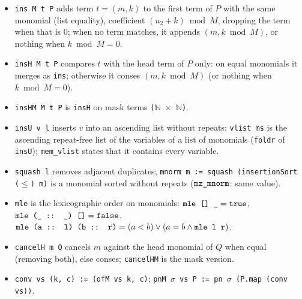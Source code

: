 \begin{definition}\label{def:lean-pathsum-ins}
\begin{itemize}
\item \textnormal{\texttt{ins M t P}} adds term $t=(m,k)$ to the first term of $P$ with the same monomial (list
  equality), coefficient $(u_2+k)\bmod M$, dropping the term when that is $0$; when no term
  matches, it appends $(m, k\bmod M)$, or nothing when $k\bmod M=0$.
\item \textnormal{\texttt{insH M t P}} compares $t$ with the head term of $P$ only: on equal monomials it merges
  as \textnormal{\texttt{ins}}; otherwise it conses $(m,k\bmod M)$ (or nothing when $k\bmod M = 0$).
\item \textnormal{\texttt{insHM M t P}} is \textnormal{\texttt{insH}} on mask terms \textnormal{\texttt{(\allowbreak{}\ensuremath{\mathbb{N}} \ensuremath{\times} \ensuremath{\mathbb{N}})}}.
\item \textnormal{\texttt{insU v l}} inserts $v$ into an ascending list without repeats; \textnormal{\texttt{vlist ms}} is the
  ascending repeat-free list of the variables of a list of monomials
  (\textnormal{\texttt{foldr}} of \textnormal{\texttt{insU}}); \textnormal{\texttt{mem\_\allowbreak{}vlist}} states that it contains every variable.
\item \textnormal{\texttt{squash l}} removes adjacent duplicates; \textnormal{\texttt{mnorm m := squash (\allowbreak{}insertionSort (\allowbreak{}\ensuremath{\le}) m)}}
  is a monomial sorted without repeats ($\textnormal{\texttt{mz\_\allowbreak{}mnorm}}$: same value).
\item \textnormal{\texttt{mle}} is the lexicographic order on monomials:
  $\textnormal{\texttt{mle [] \_\allowbreak{}}} = \textnormal{\texttt{true}}$, $\textnormal{\texttt{mle (\allowbreak{}\_\allowbreak{} :: \_\allowbreak{}) []}} = \textnormal{\texttt{false}}$,
  $\textnormal{\texttt{mle (\allowbreak{}a :: l) (\allowbreak{}b :: r)}} = (a<b)\vee(a=b\wedge \textnormal{\texttt{mle l r}})$.
\item \textnormal{\texttt{cancelH m Q}} cancels $m$ against the head monomial of $Q$ when equal (removing both),
  else conses; \textnormal{\texttt{cancelHM}} is the mask version.
\item \textnormal{\texttt{conv vs (\allowbreak{}k,\allowbreak{} c) := (\allowbreak{}ofM vs k,\allowbreak{} c)}}; \textnormal{\texttt{pnM \ensuremath{\sigma} vs P := pn \ensuremath{\sigma} (\allowbreak{}P.\allowbreak{}map (\allowbreak{}conv vs))}}.
\end{itemize}
\end{definition}

